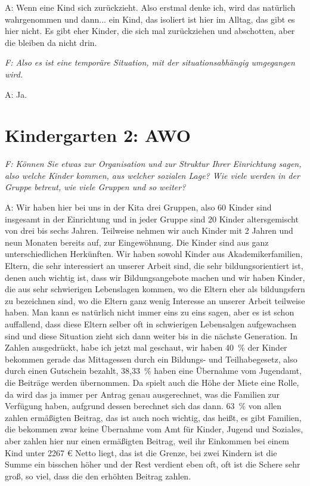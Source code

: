 \begin{linenumbers}
A: Wenn eine Kind sich zurückzieht. Also erstmal denke ich, wird das natürlich wahrgenommen und dann... ein Kind, das isoliert ist hier im Alltag, das gibt es hier nicht. Es gibt eher Kinder, die sich mal zurückziehen und abschotten, aber die bleiben da nicht drin. 

\emph{F: Also es ist eine temporäre Situation, mit der situationsabhängig umgegangen wird.} 

A: Ja.   

\end{linenumbers}

   
   
 

\section{Kindergarten 2: AWO}

\emph{F:  Können Sie etwas zur Organisation und zur Struktur Ihrer Einrichtung sagen, also welche Kinder kommen, aus welcher sozialen Lage? Wie viele werden in der Gruppe betreut, wie viele Gruppen und so weiter?} 

A: Wir haben hier bei uns in der Kita drei Gruppen, also 60 Kinder sind insgesamt in der Einrichtung und in jeder Gruppe sind 20 Kinder altersgemischt von drei bis sechs Jahren. Teilweise nehmen wir auch Kinder mit 2 Jahren und neun Monaten bereits auf, zur Eingewöhnung. Die Kinder sind aus ganz unterschiedlichen Herkünften. Wir haben sowohl Kinder aus Akademikerfamilien, Eltern, die sehr interessiert an unserer Arbeit sind, die sehr bildungsorientiert ist, denen auch wichtig ist, dass wir Bildungsangebote machen und wir haben Kinder, die aus sehr schwierigen Lebenslagen kommen, wo die Eltern eher als bildungsfern zu bezeichnen sind, wo die Eltern ganz wenig Interesse an unserer Arbeit teilweise haben. Man kann es natürlich nicht immer eins zu eins sagen, aber es ist schon auffallend, dass diese Eltern selber oft in schwierigen Lebensalgen aufgewachsen sind und diese Situation zieht sich dann weiter bis in die nächste Generation. In Zahlen ausgedrückt, habe ich jetzt mal geschaut, wir haben 40~\% der Kinder bekommen gerade das Mittagessen durch ein Bildungs- und Teilhabegesetz, also durch einen Gutschein bezahlt, 38,33~\% haben eine Übernahme vom Jugendamt, die Beiträge werden übernommen. Da spielt auch die Höhe der Miete eine Rolle, da wird das ja immer per Antrag genau ausgerechnet, was die Familien zur Verfügung haben, aufgrund dessen berechnet sich das dann. 63~\% von allen zahlen ermäßigten Beitrag, das ist auch noch wichtig, das heißt, es gibt Familien, die bekommen zwar keine Übernahme vom Amt für Kinder, Jugend und Soziales, aber zahlen hier nur einen ermäßigten Beitrag, weil ihr Einkommen bei einem Kind unter 2267 € Netto liegt, das ist die Grenze, bei zwei Kindern ist die Summe ein bisschen höher und der Rest verdient eben oft, oft ist die Schere sehr groß, so viel, dass die den erhöhten Beitrag zahlen.

